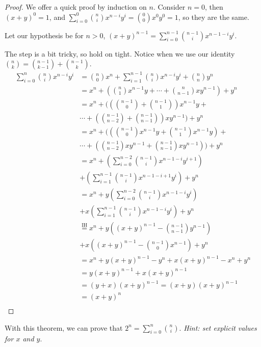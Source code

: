 \documentclass[main.tex]{subfiles}
\begin{document}
\begin{proof}
	We offer a quick proof by induction on \(n\). Consider \(n=0\), then \((x+y)^0 = 1\), and \(\sum_{i=0}^{0} \binom{n}{i} x^{n-i}y^i = \binom{0}{0} x^0y^0 = 1\), so they are the same.
	
	Let our hypothesis be for \(n>0\), \((x+y)^{n-1} = \sum_{i=0}^{n-1} \binom{n-1}{i} x^{n-1-i}y^i\).
	
	The step is a bit tricky, so hold on tight. Notice when we use our identity \(\binom{n}{k} = \binom{n-1}{k-1} + \binom{n-1}{k}\).
	\begin{align*}
	\sum_{i=0}^{n} \binom{n}{i} x^{n-i}y^i &= \binom{n}{0} x^n + \sum_{i=1}^{n-1} \binom{n}{i} x^{n-i}y^i + \binom{n}{n} y^n \\
	&= x^n + ( \binom{n}{1}x^{n-1}y + \cdots + \binom{n}{n-1}xy^{n-1} ) + y^n \\
	&= x^n + ( (\binom{n-1}{0} + \binom{n-1}{1})x^{n-1}y + \\
	& \cdots + (\binom{n-1}{n-2} + \binom{n-1}{n-1})xy^{n-1} ) + y^n \\
	&= x^n + ( (\binom{n-1}{0}x^{n-1}y + \binom{n-1}{1}x^{n-1}y) + \\
	& \cdots + (\binom{n-1}{n-2}xy^{n-1} + \binom{n-1}{n-1}xy^{n-1}) ) + y^n \\
	&= x^n + (\sum_{i=0}^{n-2} \binom{n-1}{i} x^{n-1-i}y^{i+1}) \\
	& + (\sum_{i=1}^{n-1} \binom{n-1}{i} x^{n-1-i+1}y^{i}) + y^n \\
	&= x^n + y(\sum_{i=0}^{n-2} \binom{n-1}{i} x^{n-1-i}y^{i}) \\
	& + x(\sum_{i=1}^{n-1} \binom{n-1}{i} x^{n-1-i}y^{i}) + y^n \\
	&\stackrel{\text{IH}}{=} x^n + y((x+y)^{n-1} - \binom{n-1}{n-1}y^{n-1}) \\
	& + x((x+y)^{n-1} - \binom{n-1}{0}x^{n-1}) + y^n \\
	&= x^n + y(x+y)^{n-1} - y^{n} + x(x+y)^{n-1} - x^{n} + y^n \\
	&= y(x+y)^{n-1} + x(x+y)^{n-1} \\
	&= (y+x)(x+y)^{n-1} = (x+y)(x+y)^{n-1} \\
	&= (x+y)^n \\
	\end{align*}
\end{proof}

\begin{rem}
	With this theorem, we can prove that \(2^n = \sum_{i=0}^{n} \binom{n}{i}\). \textit{Hint: set explicit values for \(x\) and \(y\)}.
\end{rem}
\end{document}
